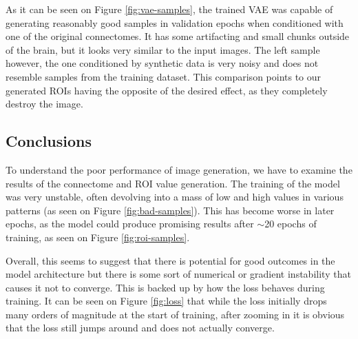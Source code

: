 	
	As it can be seen on Figure \ref{fig:vae-samples}, the trained VAE was capable of generating reasonably good samples in validation epochs when conditioned with one of the original connectomes. It has some artifacting and small chunks outside of the brain, but it looks very similar to the input images. The left sample however, the one conditioned by synthetic data is very noisy and does not resemble samples from the training dataset. This comparison points to our generated ROIs having the opposite of the desired effect, as they completely destroy the image.
	
	\subsection{Conclusions}
	
	To understand the poor performance of image generation, we have to examine the results of the connectome and ROI value generation. The training of the model was very unstable, often devolving into a mass of low and high values in various patterns (as seen on Figure \ref{fig:bad-samples}).
	This has become worse in later epochs, as the model could produce promising results after $\sim$20 epochs of training, as seen on Figure \ref{fig:roi-samples}. 
	
	Overall, this seems to suggest that there is potential for good outcomes in the model architecture but there is some sort of numerical or gradient instability that causes it not to converge. This is backed up by how the loss behaves during training. It can be seen on Figure \ref{fig:loss} that while the loss initially drops many orders of magnitude at the start of training, after zooming in it is obvious that the loss still jumps around and does not actually converge.
	
